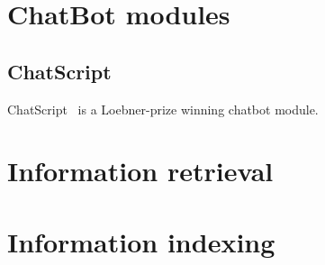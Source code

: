 \section{ChatBot modules}


\subsection{ChatScript}
\label{subsec:chatscript}

ChatScript~\cite{wilcox2013} is a Loebner-prize winning chatbot module.

\section{Information retrieval}


\section{Information indexing}

